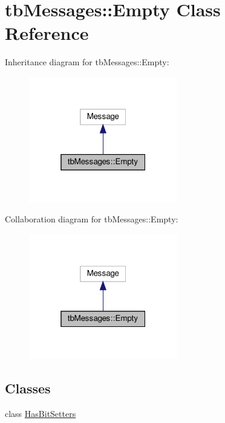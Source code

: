 \hypertarget{classtbMessages_1_1Empty}{}\section{tb\+Messages\+:\+:Empty Class Reference}
\label{classtbMessages_1_1Empty}


Inheritance diagram for tb\+Messages\+:\+:Empty\+:
\nopagebreak
\begin{figure}[H]
\begin{center}
\leavevmode
\includegraphics[width=184pt]{classtbMessages_1_1Empty__inherit__graph}
\end{center}
\end{figure}


Collaboration diagram for tb\+Messages\+:\+:Empty\+:
\nopagebreak
\begin{figure}[H]
\begin{center}
\leavevmode
\includegraphics[width=184pt]{classtbMessages_1_1Empty__coll__graph}
\end{center}
\end{figure}
\subsection*{Classes}
\begin{DoxyCompactItemize}
\item 
class \hyperlink{classtbMessages_1_1Empty_1_1HasBitSetters}{Has\+Bit\+Setters}
\end{DoxyCompactItemize}
